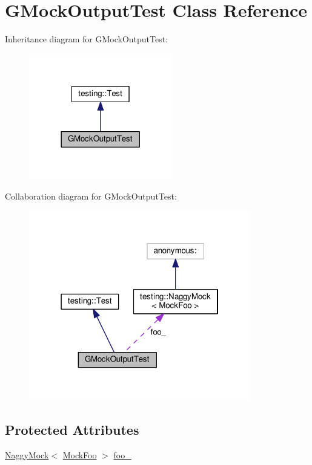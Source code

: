 \hypertarget{classGMockOutputTest}{}\section{G\+Mock\+Output\+Test Class Reference}
\label{classGMockOutputTest}


Inheritance diagram for G\+Mock\+Output\+Test\+:\nopagebreak
\begin{figure}[H]
\begin{center}
\leavevmode
\includegraphics[width=177pt]{classGMockOutputTest__inherit__graph}
\end{center}
\end{figure}


Collaboration diagram for G\+Mock\+Output\+Test\+:\nopagebreak
\begin{figure}[H]
\begin{center}
\leavevmode
\includegraphics[width=274pt]{classGMockOutputTest__coll__graph}
\end{center}
\end{figure}
\subsection*{Protected Attributes}
\begin{DoxyCompactItemize}
\item 
\hyperlink{classtesting_1_1NaggyMock}{Naggy\+Mock}$<$ \hyperlink{classMockFoo}{Mock\+Foo} $>$ \hyperlink{classGMockOutputTest_aed97d2ca515d69466968c60575cc18a2}{foo\+\_\+}
\end{DoxyCompactItemize}
